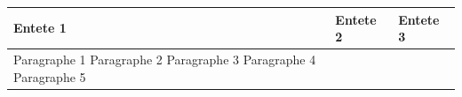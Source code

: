 \documentclass[11pt,a4paper]{article}
\begin{document}
\begin{table}[h]
\begin{tabular}{|l|l|l|}
\hline
Entete 1 & Entete 2 & Entete 3 \\ \hline
Paragraphe 1  Paragraphe 2  Paragraphe 3  Paragraphe 4  Paragraphe 5 &  &  \\ \hline
\end{tabular}
\end{table}
\end{document}

